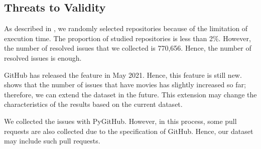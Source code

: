 \subsection{Threats to Validity}
\label{sec:limitation}

As described in , we randomly selected 
repositories because of the limitation of execution time. 
The proportion of studied repositories is less than 2\%. 
However, the number of resolved issues that 
we collected is 770,656. 
Hence, the number of resolved issues is enough. 

GitHub has released the feature in May 2021. 
Hence, this feature is still new. 
 shows that the number of 
issues that have movies has slightly increased so far; 
therefore, we can extend the dataset in the future. 
This extension may change the characteristics of 
the results based on the current dataset. 

We collected the issues with PyGitHub. 
However, in this process, some pull requests 
are also collected due to the specification of GitHub. 
Hence, our dataset may include such pull requests. 